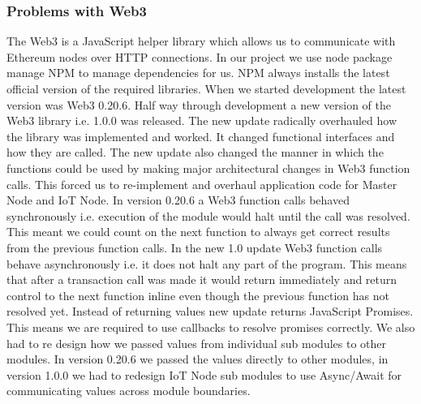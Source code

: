 \subsubsection{Problems with Web3}
The Web3 is a JavaScript helper library which allows us to communicate with Ethereum nodes over HTTP connections. In our project we use node package manage NPM to manage dependencies for us. NPM always installs the latest official version of the required libraries. When we started development the latest version was Web3 0.20.6. Half way through development a new version of the Web3 library i.e. 1.0.0 was released. The new update radically overhauled how the library was implemented and worked. It changed functional interfaces and how they are called. The new update also changed the manner in which the functions could be used by making major architectural changes in Web3 function calls. This forced us to re-implement and overhaul application code for Master Node and IoT Node. In version 0.20.6 a Web3 function calls behaved synchronously i.e. execution of the module would halt until the call was resolved. This meant we could count on the next function to always get correct results from the previous function calls. In the new 1.0 update Web3 function calls behave asynchronously i.e. it does not halt any part of the program. This means that after a transaction call was made it would return immediately and return control to the next function inline even though the previous function has not resolved yet. Instead of returning values new update returns JavaScript Promises. This means we are required to use callbacks to resolve promises correctly. We also had to re design how we passed values from individual sub modules to other modules. In version 0.20.6 we passed the values directly to other modules, in version 1.0.0 we had to redesign IoT Node sub modules to use Async/Await for communicating values across module boundaries.  

